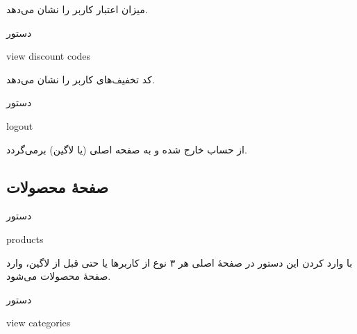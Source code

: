 \documentclass[]{article}
\begin{document}
میزان اعتبار کاربر را نشان می‌دهد.

\hrulefill


\begin{mybox}[colback=yellow]{دستور}

\begin{latin}

view discount codes

\end{latin}

\end{mybox}

کد تخفیف‌های کاربر را نشان می‌دهد.

\hrulefill


\begin{mybox}[colback=yellow]{دستور}

\begin{latin}

logout

\end{latin}

\end{mybox}

از حساب خارج شده و به صفحه اصلی (یا لاگین) برمی‌گردد.


\newpage

\subsection*{{\titr صفحهٔ محصولات}}

\begin{mybox}[colback=yellow]{دستور}

\begin{latin}

products

\end{latin}

\end{mybox}


با وارد کردن این دستور در صفحهٔ اصلی هر ۳ نوع از کاربرها یا حتی قبل از لاگین، وارد صفحهٔ محصولات می‌شود.

\hrulefill

\begin{mybox}[colback=yellow]{دستور}

\begin{latin}

view categories

\end{latin}

\end{mybox}
\end{document}
